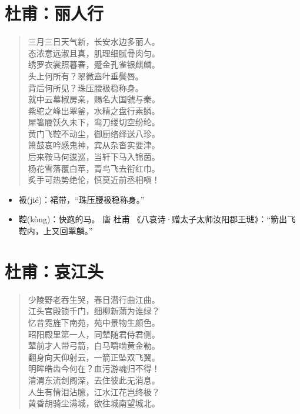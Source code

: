 \documentclass[12pt,oneside]{book}
\newenvironment{shici}{%
\begin{verse}\centering\yanti\large\hspace{12pt}}{\end{verse}}
\begin{document}
\begin{common-format}
\chapter{杜甫：丽人行}
\begin{shici}
三月三日天气新，长安水边多丽人。\\
态浓意远淑且真，肌理细腻骨肉匀。\\
绣罗衣裳照暮春，蹙金孔雀银麒麟。\\
头上何所有？翠微盍叶垂鬓唇。\\
背后何所见？珠压腰衱稳称身。\\
就中云幕椒房亲，赐名大国虢与秦。\\
紫驼之峰出翠釜，水精之盘行素鳞。\\
犀箸餍饫久未下，鸾刀缕切空纷纶。\\
黄门飞鞚不动尘，御厨络绎送八珍。\\
箫鼓哀吟感鬼神，宾从杂沓实要津。\\
后来鞍马何逡巡，当轩下马入锦茵。\\
杨花雪落覆白苹，青鸟飞去衔红巾。\\
炙手可热势绝伦，慎莫近前丞相嗔！
\end{shici}

\begin{itemize}
\item 衱(jié)：裙带，“珠压腰衱稳称身。”
\item 鞚(kòng)：快跑的马。 唐 杜甫 《八哀诗·赠太子太师汝阳郡王琎》：“箭出飞鞚内，上又回翠麟。”
\end{itemize}


\chapter{杜甫：哀江头}
\begin{shici}
少陵野老吞生哭，春日潜行曲江曲。\\
江头宫殿锁千门，细柳新蒲为谁绿？\\
忆昔霓旌下南苑，苑中景物生颜色。\\
昭阳殿里第一人，同辇随君侍君侧。\\
辇前才人带弓箭，白马嚼啮黄金勒。\\
翻身向天仰射云，一箭正坠双飞翼。\\
明眸皓齿今何在？血污游魂归不得！\\
清渭东流剑阁深，去住彼此无消息。\\
人生有情泪沾臆，江水江花岂终极？\\
黄昏胡骑尘满城，欲往城南望城北。
\end{shici}



\end{common-format}
\end{document}
